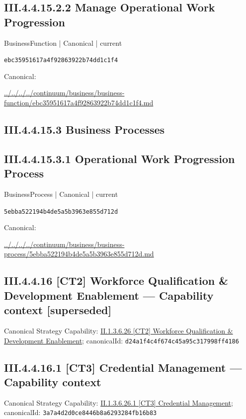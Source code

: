 \documentclass[10pt,a4paper]{article}
\begin{document}
\subsection*{III.4.4.15.2.2 Manage Operational Work Progression}
\label{element-ebc35951617a4f92863922b74dd1c1f4}
{\small BusinessFunction | Canonical | current}\par
\texttt{ebc35951617a4f92863922b74dd1c1f4}\par
Canonical: \par
{\footnotesize\url{../../../../continuum/business/business-function/ebc35951617a4f92863922b74dd1c1f4.md}}\par
\subsection*{III.4.4.15.3 Business Processes}
\subsection*{III.4.4.15.3.1 Operational Work Progression Process}
\label{element-5ebba522194b4de5a5b3963e855d712d}
{\small BusinessProcess | Canonical | current}\par
\texttt{5ebba522194b4de5a5b3963e855d712d}\par
Canonical: \par
{\footnotesize\url{../../../../continuum/business/business-process/5ebba522194b4de5a5b3963e855d712d.md}}\par
\subsection*{III.4.4.16 [CT2] Workforce Qualification \& Development Enablement — Capability context [superseded]}
Canonical Strategy Capability: \hyperref[element-d24a1f4c4f674c45a95c317998ff4186]{II.1.3.6.26 [CT2] Workforce Qualification \& Development Enablement}; canonicalId: \texttt{d24a1f4c4f674c45a95c317998ff4186}\par
\subsection*{III.4.4.16.1 [CT3] Credential Management — Capability context}
Canonical Strategy Capability: \hyperref[element-3a7a4d2d0ce8446b8a6293284fb16b83]{II.1.3.6.26.1 [CT3] Credential Management}; canonicalId: \texttt{3a7a4d2d0ce8446b8a6293284fb16b83}\par
\end{document}
